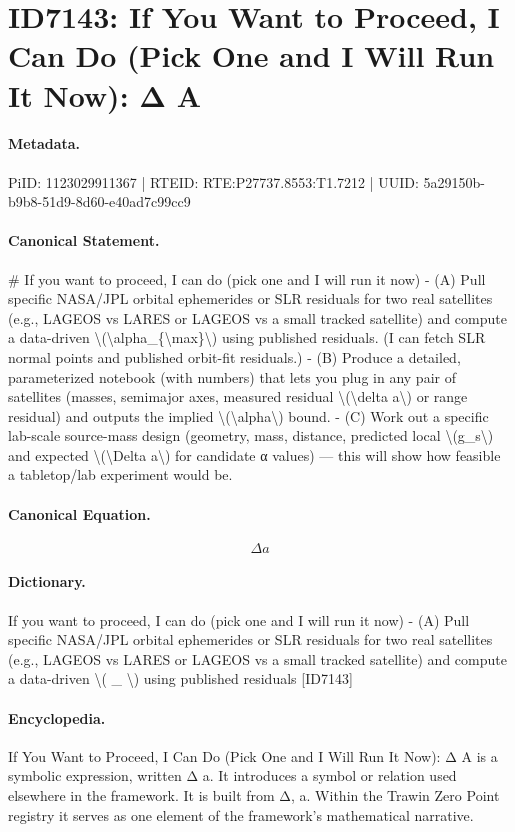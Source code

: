 \section*{ID7143: If You Want to Proceed, I Can Do (Pick One and I Will Run It Now): Δ A}
\paragraph{Metadata.}
PiID: 1123029911367 | RTEID: RTE:P27737.8553:T1.7212 | UUID: 5a29150b-b9b8-51d9-8d60-e40ad7c99cc9

\paragraph{Canonical Statement.}
\# If you want to proceed, I can do (pick one and I will run it now) - (A) Pull specific NASA/JPL orbital ephemerides or SLR residuals for two real satellites (e.g., LAGEOS vs LARES or LAGEOS vs a small tracked satellite) and compute a data-driven \textbackslash{}(\textbackslash{}alpha\_\{\textbackslash{}max\}\textbackslash{}) using published residuals. (I can fetch SLR normal points and published orbit-fit residuals.) - (B) Produce a detailed, parameterized notebook (with numbers) that lets you plug in any pair of satellites (masses, semimajor axes, measured residual \textbackslash{}(\textbackslash{}delta a\textbackslash{}) or range residual) and outputs the implied \textbackslash{}(\textbackslash{}alpha\textbackslash{}) bound. - (C) Work out a specific lab-scale source-mass design (geometry, mass, distance, predicted local \textbackslash{}(g\_s\textbackslash{}) and expected \textbackslash{}(\textbackslash{}Delta a\textbackslash{}) for candidate α values) — this will show how feasible a tabletop/lab experiment would be.

\paragraph{Canonical Equation.}
\[
\Delta a
\]

\paragraph{Dictionary.}
If you want to proceed, I can do (pick one and I will run it now) - (A) Pull specific NASA/JPL orbital ephemerides or SLR residuals for two real satellites (e.g., LAGEOS vs LARES or LAGEOS vs a small tracked satellite) and compute a data-driven \textbackslash{}( \_ \textbackslash{}) using published residuals [ID7143]

\paragraph{Encyclopedia.}
If You Want to Proceed, I Can Do (Pick One and I Will Run It Now): Δ A is a symbolic expression, written Δ a. It introduces a symbol or relation used elsewhere in the framework. It is built from Δ, a. Within the Trawin Zero Point registry it serves as one element of the framework's mathematical narrative.
